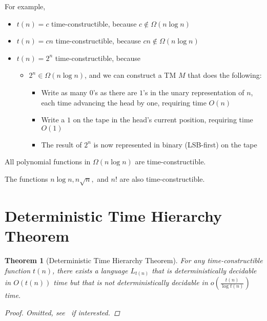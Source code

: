 \documentclass[a4paper]{report}
\newtheorem{theo}{Theorem}
\newcommand{\bookref}[3]{\marginpar{\faBook{}~#1\\Chapter #2\\Section #3}}
\theoremstyle{definition}
\begin{document}
For example,
\begin{itemize}
\item $t(n) = c$  time-constructible, because $c \not\in \Omega(n \log n)$
\item $t(n) = cn$  time-constructible, because $cn \not\in \Omega(n \log n)$
\item $t(n) = 2^n$  time-constructible, because
\begin{itemize}
\item $2^n \in \Omega(n \log n)$, and we can construct a TM $M$ that does the following:
\begin{itemize}
\item Write as many $0$'s as there are $1$'s in the unary representation of $n$, each time advancing the head by one, requiring time $O(n)$
\item Write a $1$ on the tape in the head's current position, requiring time $O(1)$
\item The result of $2^n$ is now represented in binary (LSB-first) on the tape
\end{itemize}
\end{itemize}
\end{itemize}

All polynomial functions in $\Omega(n \log n)$ are time-constructible.

The functions $n \log n, n \sqrt{n},$ and $n!$ are also time-constructible.

\section{Deterministic Time Hierarchy Theorem}
\bookref{ER}{28}{28.9.1}
\begin{theo}[Deterministic Time Hierarchy Theorem]
For any time-constructible function $t(n)$, there exists a language $L_{t(n)}$ that is deterministically decidable in $O(t(n))$ time but that is not deterministically decidable in $o\left(\frac{t(n)}{\log t(n)}\right)$ time.
\begin{proof}
Omitted, see~\citep{rich2008automata} if interested.
\end{proof}
\end{theo}
\end{document}

